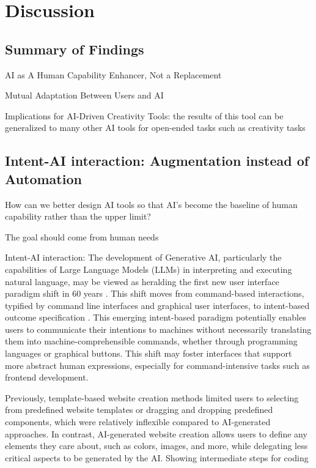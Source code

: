 \section{Discussion}

\subsection{Summary of Findings}

AI as A Human Capability Enhancer, Not a Replacement

Mutual Adaptation Between Users and AI

Implications for AI-Driven Creativity Tools: the results of this tool can be generalized to many other AI tools for open-ended tasks such as creativity tasks

\subsection{Intent-AI interaction: Augmentation instead of Automation}

How can we better design AI tools
so that AI's become the baseline of human capability rather than the upper limit?

The goal should come from human needs

Intent-AI interaction: The development of Generative AI, particularly the capabilities of Large Language Models (LLMs) in interpreting and executing natural language, may be viewed as heralding the first new user interface paradigm shift in 60 years \cite{nielsen2023ai}. This shift moves from command-based interactions, typified by command line interfaces and graphical user interfaces, to intent-based outcome specification \cite{nielsen2023ai}. This emerging intent-based paradigm potentially enables users to communicate their intentions to machines without necessarily translating them into machine-comprehensible commands, whether through programming languages or graphical buttons. This shift may foster interfaces that support more abstract human expressions, especially for command-intensive tasks such as frontend development.

Previously, template-based website creation methods limited users to selecting from predefined website templates or dragging and dropping predefined components, which were relatively inflexible compared to AI-generated approaches. In contrast, AI-generated website creation allows users to define any elements they care about, such as colors, images, and more, while delegating less critical aspects to be generated by the AI. Showing intermediate steps for coding \cite{zhu-tianSketchThenGenerate2024}

